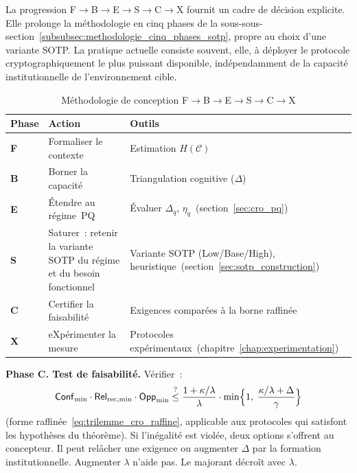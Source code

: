 \begin{sloppypar}
La progression F$\to$B$\to$E$\to$S$\to$C$\to$X fournit un cadre de d\'ecision explicite. Elle
prolonge la m\'ethodologie en cinq phases de la
sous-sous-section~\ref{subsubsec:methodologie_cinq_phases_sotp}, propre au choix d'une variante SOTP. La
pratique actuelle consiste souvent, elle, \`a d\'eployer le protocole
cryptographiquement le plus puissant disponible, ind\'ependamment de
la capacit\'e institutionnelle de l'environnement cible.

\begin{table}[htbp]
\centering
\caption{M\'ethodologie de conception
F$\to$B$\to$E$\to$S$\to$C$\to$X}
\label{tab:methodologie_FBESCX}
\begin{tabular}{@{}p{1.8cm}p{2.8cm}p{6.5cm}@{}}
\toprule
\textbf{Phase} & \textbf{Action} & \textbf{Outils} \\
\midrule
\textbf{F} & Formaliser le contexte
  & Estimation $H(\mathcal{C})$~\cite{Shannon48,CoverThomas06} \\
\textbf{B} & Borner la capacit\'e
  & Triangulation cognitive ($\Delta$)~\cite{Miller56,Simon82,Ericsson95,Chi2006} \\
\textbf{E} & \'Etendre au r\'egime~PQ
  & \'Evaluer $\Delta_q$, $\eta_q$~(section~\ref{sec:cro_pq}) \\
\textbf{S} & Saturer~: retenir la variante SOTP du r\'egime et du besoin fonctionnel
  & Variante SOTP (Low/Base/High), heuristique~(section~\ref{sec:sotp_construction}) \\
\textbf{C} & Certifier la faisabilit\'e
  & Exigences comparées \`a la borne raffin\'ee~\cite{MINKA2026CLO,GDPR2016,eIDAS14} \\
\textbf{X} & eXp\'erimenter la mesure
  & Protocoles exp\'erimentaux~(chapitre~\ref{chap:experimentation}) \\
\bottomrule
\end{tabular}
\end{table}

\noindent\textbf{Phase C. Test de faisabilit\'e.} V\'erifier~:
\begin{equation}
\mathsf{Conf}_{\min} \cdot \mathsf{Rel}_{\mathrm{rec},\min} \cdot \mathsf{Opp}_{\min} \stackrel{?}{\leq}
\frac{1+\kappa/\lambda}{\lambda}\cdot\min\Bigl\{1,\;\frac{\kappa/\lambda+\Delta}{\gamma}\Bigr\}
\label{eq:test_faisabilite}
\end{equation}
(forme raffin\'ee~\eqref{eq:trilemme_cro_raffine}, applicable aux protocoles qui
satisfont les hypoth\`eses du th\'eor\`eme).
Si l'in\'egalit\'e est viol\'ee, deux options s'offrent au concepteur. Il peut rel\^acher une exigence
ou augmenter $\Delta$ par la formation institutionnelle. Augmenter $\lambda$ n'aide pas.
Le majorant d\'ecro\^it avec $\lambda$.


\end{sloppypar}
